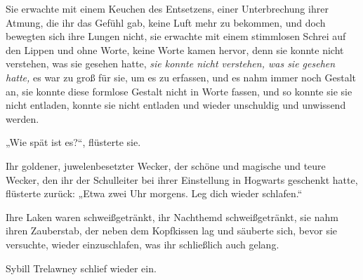 Sie erwachte mit einem Keuchen des Entsetzens, einer Unterbrechung ihrer Atmung, die ihr das Gefühl gab, keine Luft mehr zu bekommen, und doch bewegten sich ihre Lungen nicht, sie erwachte mit einem stimmlosen Schrei auf den Lippen und ohne Worte, keine Worte kamen hervor, denn sie konnte nicht verstehen, was sie gesehen hatte, \emph{sie konnte nicht verstehen, was sie gesehen hatte,} es war zu groß für sie, um es zu erfassen, und es nahm immer noch Gestalt an, sie konnte diese formlose Gestalt nicht in Worte fassen, und so konnte sie sie nicht entladen, konnte sie nicht entladen und wieder unschuldig und unwissend werden.

„Wie spät ist es?“, flüsterte sie.

Ihr goldener, juwelenbesetzter Wecker, der schöne und magische und teure Wecker, den ihr der Schulleiter bei ihrer Einstellung in Hogwarts geschenkt hatte, flüsterte zurück: „Etwa zwei Uhr morgens. Leg dich wieder schlafen.“

Ihre Laken waren schweißgetränkt, ihr Nachthemd schweißgetränkt, sie nahm ihren Zauberstab, der neben dem Kopfkissen lag und säuberte sich, bevor sie versuchte, wieder einzuschlafen, was ihr schließlich auch gelang.

Sybill Trelawney schlief wieder ein.

